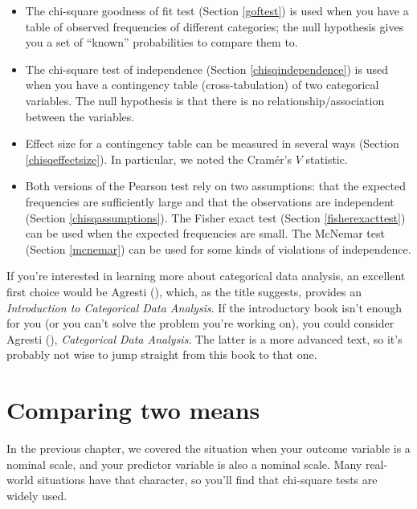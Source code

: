 \documentclass[
  11pt,
  a4paper,
  twoside,symmetric,openright]{book}
\providecommand{\tightlist}{%
  \setlength{\itemsep}{0pt}\setlength{\parskip}{0pt}}
\theoremstyle{break}
\theoremstyle{break}
\begin{document}
\begin{itemize}
\tightlist
\item
  The chi-square goodness of fit test (Section \ref{goftest}) is used when you have a table of observed frequencies of different categories; the null hypothesis gives you a set of ``known'' probabilities to compare them to.
\item
  The chi-square test of independence (Section \ref{chisqindependence}) is used when you have a contingency table (cross-tabulation) of two categorical variables. The null hypothesis is that there is no relationship/association between the variables.
\item
  Effect size for a contingency table can be measured in several ways (Section \ref{chisqeffectsize}). In particular, we noted the Cramér's \(V\) statistic.
\item
  Both versions of the Pearson test rely on two assumptions: that the expected frequencies are sufficiently large and that the observations are independent (Section \ref{chisqassumptions}). The Fisher exact test (Section \ref{fisherexacttest}) can be used when the expected frequencies are small. The McNemar test (Section \ref{mcnemar}) can be used for some kinds of violations of independence.
\end{itemize}

If you're interested in learning more about categorical data analysis, an excellent first choice would be Agresti (), which, as the title suggests, provides an \emph{Introduction to Categorical Data Analysis}. If the introductory book isn't enough for you (or you can't solve the problem you're working on), you could consider Agresti (), \emph{Categorical Data Analysis}. The latter is a more advanced text, so it's probably not wise to jump straight from this book to that one.

\chapter{Comparing two means}\label{ttest}

In the previous chapter, we covered the situation when your outcome variable is a nominal scale, and your predictor variable is also a nominal scale. Many real-world situations have that character, so you'll find that chi-square tests are widely used.
\end{document}

